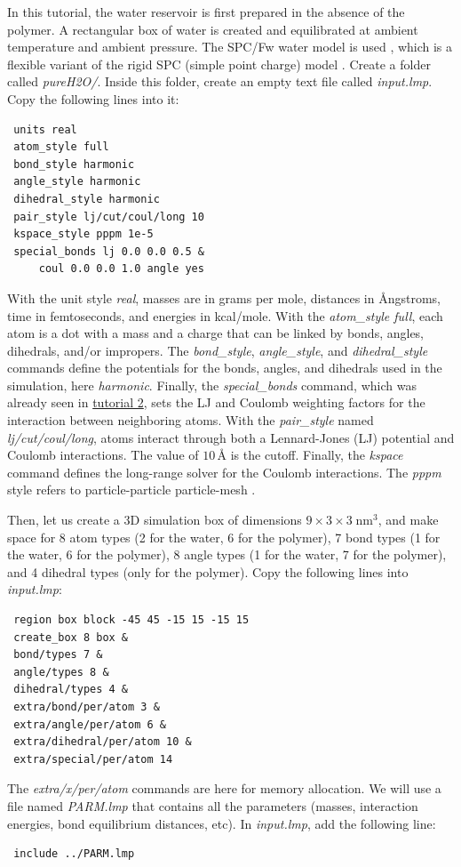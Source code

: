 \documentclass[9pt,tutorial]{livecoms}
\begin{document}
In this tutorial, the water reservoir is first prepared in the absence of the polymer.
A rectangular box of water is created and equilibrated at ambient temperature and
ambient pressure. The SPC/Fw water model is used \cite{wu2006flexible}, which is
a flexible variant of the rigid SPC (simple point charge) model \cite{berendsen1981interaction}.
Create a folder called \textit{pureH2O/}. Inside this folder, create an empty text
file called \textit{input.lmp}. Copy the following lines into it:
\begin{lstlisting}
 units real
 atom_style full
 bond_style harmonic
 angle_style harmonic
 dihedral_style harmonic
 pair_style lj/cut/coul/long 10
 kspace_style pppm 1e-5
 special_bonds lj 0.0 0.0 0.5 &
     coul 0.0 0.0 1.0 angle yes
\end{lstlisting}
With the unit style \textit{real}, masses are in grams per mole, distances in
Ångstroms, time in femtoseconds, and energies in kcal/mole. With the \textit{atom\_style full}, each atom is a dot with a mass and a charge that can be linked by bonds, angles, dihedrals, and/or impropers. The \textit{bond\_style},
\textit{angle\_style}, and \textit{dihedral\_style} commands define the potentials
for the bonds, angles, and dihedrals used in the simulation, here \textit{harmonic}.
Finally, the \textit{special\_bonds} command, which was already seen in
\hyperref[carbon-nanotube-label]{tutorial 2}, sets the LJ and Coulomb weighting
factors for the interaction between neighboring atoms. With the \textit{pair\_style}
named \textit{lj/cut/coul/long}, atoms interact through both a Lennard-Jones (LJ)
potential and Coulomb interactions. The value of $10\,\text{\AA{}}$ is the cutoff.
Finally, the \textit{kspace} command defines the long-range solver for the Coulomb
interactions. The \textit{pppm} style refers to particle-particle particle-mesh \cite{luty1996calculating}.

Then, let us create a 3D simulation box of dimensions $9 \times 3 \times 3 \; \text{nm}^3$,
and make space for 8 atom types (2 for the water, 6 for the polymer), 7 bond types
(1 for the water, 6 for the polymer), 8 angle types (1 for the water, 7 for the polymer),
and 4 dihedral types (only for the polymer). Copy the following lines into \textit{input.lmp}:
\begin{lstlisting}
 region box block -45 45 -15 15 -15 15
 create_box 8 box &
 bond/types 7 &
 angle/types 8 &
 dihedral/types 4 &
 extra/bond/per/atom 3 &
 extra/angle/per/atom 6 &
 extra/dihedral/per/atom 10 &
 extra/special/per/atom 14
\end{lstlisting}
The \textit{extra/x/per/atom} commands are here for
memory allocation. We will use a file named \textit{PARM.lmp} that contains
all the parameters (masses, interaction energies, bond equilibrium
distances, etc). In \textit{input.lmp}, add the following line:
\begin{lstlisting}
 include ../PARM.lmp
\end{lstlisting}
\end{document}
